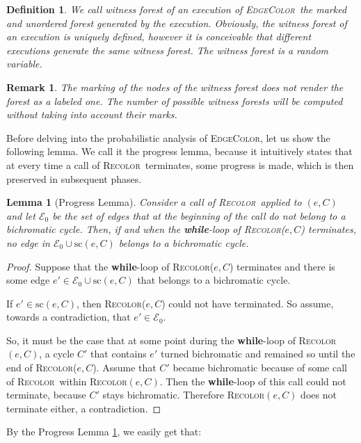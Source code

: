 \documentclass{amsart}
\theoremstyle{plain}
\newtheorem{definition}{Definition}
\newtheorem{lemma}{Lemma}
\newtheorem{remark}{Remark}
\newcommand{\EC}{\textsc{EdgeColor}}
\newcommand{\Recolor}{\textsc{Recolor}}
\newcommand{\E}{\mathcal{E}}
\newcommand{\F}{\mathcal{F}}
\newcommand{\sco}{\mathrm{sc}}
\begin{document}
\begin{definition}\label{def:witness}
We call {\em witness forest} of an execution of \EC\ the marked and  unordered forest generated by the execution.	Obviously, the witness forest of an execution  is uniquely defined, however it is conceivable that different executions generate the same witness forest. The witness forest is a random variable. %
\end{definition}


\begin{remark}\label{rmk:marks}
The marking of the nodes of the witness forest does not render the forest as a labeled one. The number of possible witness forests will be computed without taking into account their marks. 
\end{remark}


 Before delving into the probabilistic analysis of \EC, let us show the following lemma. We call it the progress lemma, because it intuitively states that at every time a call of \Recolor\ terminates, some progress is  made, which is then preserved in subsequent phases.
\begin{lemma}[Progress Lemma] \label{lem:progr}
Consider a call of \Recolor\ applied to  $(e,C)$ and  let $\mathcal{E}_0$ 
be the set of edges that at the beginning of the call do not belong to a bichromatic cycle.  Then, if and when the {\bf while}-loop of  \Recolor($e,C$) terminates, no edge in   $\mathcal{E}_0\cup \sco(e,C)$ belongs to a bichromatic cycle. \end{lemma}
\begin{proof}
Suppose that the {\bf while}-loop of \Recolor($e,C$) terminates and there is some  edge   $e'\in\E_0\cup \sco(e,C)$ that belongs to  a bichromatic cycle.

If $e'\in \sco(e,C)$, then   \Recolor($e,C$) could not have terminated. So assume, towards a contradiction,  that $e'\in\E_0$.

So, it must be the case that at some point during the {\bf while}-loop of \Recolor$(e,C)$, a cycle $C'$ that contains $e'$ turned bichromatic and remained so until the end of \Recolor($e,C$). Assume that $C'$ became bichromatic because of  some call of \Recolor\ within \Recolor$(e,C)$. Then the {\bf while}-loop of this call  could not terminate, because $C'$  stays bichromatic. Therefore \Recolor$(e,C)$ does not terminate either, a contradiction. 
\end{proof}
%
By the Progress Lemma \ref{lem:progr}, we easily get that:
\end{document}

